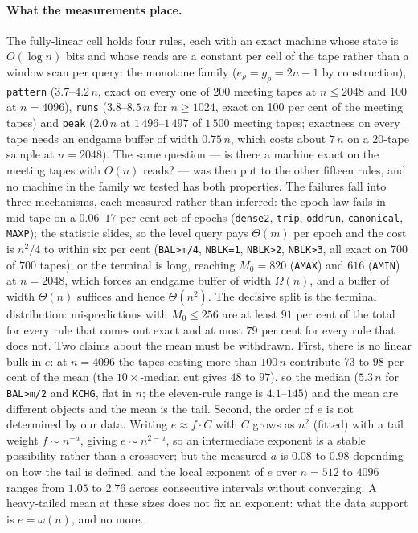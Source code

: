 \documentclass[11pt]{article}
\theoremstyle{remark}
\begin{document}
\paragraph{What the measurements place.} The fully-linear cell holds four rules, each with an exact
machine whose state is $O(\log n)$ bits and whose reads are a constant per cell of the tape rather
than a window scan per query:
the monotone family ($e_{\rho}=g_{\rho}=2n-1$ by construction), \texttt{pattern}
($3.7$--$4.2\,n$, exact on every one of 200 meeting tapes at $n\le2048$ and 100 at $n=4096$),
\texttt{runs} ($3.8$--$8.5\,n$ for $n\ge1024$, exact on 100 per cent of the meeting tapes) and
\texttt{peak} ($2.0\,n$ at $1\,496$--$1\,497$ of $1\,500$ meeting tapes; exactness on every tape needs
an endgame buffer of width $0.75\,n$, which costs about $7\,n$ on a 20-tape sample at $n=2048$). The
same question --- is there a machine
exact on the meeting tapes with $O(n)$ reads? --- was then put to the other fifteen rules, and no
machine in the family we tested has both properties. The failures fall into three mechanisms, each
measured rather than inferred:
the epoch law fails in mid-tape on a $0.06$--$17$ per cent set of epochs (\texttt{dense2},
\texttt{trip}, \texttt{oddrun}, \texttt{canonical}, \texttt{MAXP}); the statistic slides, so the
level query pays $\Theta(m)$ per epoch and the cost is $n^{2}/4$ to within six per cent
(\texttt{BAL>m/4}, \texttt{NBLK=1}, \texttt{NBLK>2}, \texttt{NBLK>3}, all exact on $700$ of $700$
tapes); or the terminal is long, reaching $M_{0}=820$ (\texttt{AMAX}) and $616$ (\texttt{AMIN}) at $n=2048$, which forces an endgame buffer of width $\Omega(n)$, and a buffer of width $\Theta(n)$ suffices and hence $\Theta(n^{2})$.
The decisive split is the terminal distribution: mispredictions with $M_{0}\le256$ are at least
$91$ per cent of the total for every rule that comes out exact and at most $79$ per cent for every
rule that does not. Two claims about the mean must be withdrawn. First, there is no linear bulk in
$e$: at $n=4096$ the tapes costing more than $100\,n$ contribute $73$ to $98$ per cent of the mean (the
$10\times$-median cut gives $48$ to $97$), so the median ($5.3\,n$ for \texttt{BAL>m/2} and \texttt{KCHG}, flat in $n$; the eleven-rule
range is $4.1$--$145$) and the mean are different objects and the mean is the
tail. Second, the order of $e$ is not determined by our data. Writing $e\approx f\cdot C$ with
$C$ grows as $n^{2}$ (fitted) with a tail weight $f\sim n^{-a}$, giving $e\sim n^{2-a}$, so an intermediate exponent
is a stable possibility rather than a crossover; but the measured $a$ is $0.08$ to $0.98$ depending on
how the tail is defined, and the local exponent of $e$ over $n=512$ to $4096$ ranges from $1.05$ to
$2.76$ across consecutive intervals without converging. A heavy-tailed mean at these sizes does not
fix an exponent: what the data support is $e=\omega(n)$, and no more.
\end{document}
